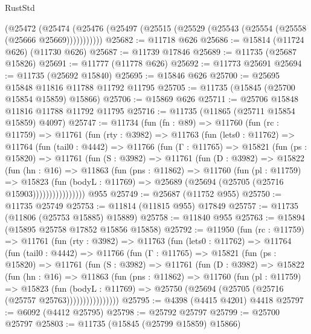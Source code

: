 \begin{lexlean}{RustStd}
\begin{coremodule}
      (@25472
        (@25474 (@25476 (@25497 (@25515 (@25529 (@25543 (@25554 (@25558 (@25666 @25669)))))))))))
@25682 := @11718 @626
@25686 := @15814 (@11724 @626) (@11730 @626)
@25687 := @11739 @17846
@25689 := @11735 (@25687 @15826)
@25691 := @11777 (@11778 @626)
@25692 := @11773 @25691
@25694 := @11735 (@25692 @15840)
@25695 := @15846 @626
@25700 := @25695 @15848 @11816 @11788 @11792 @11795
@25705 := @11735 (@15845 (@25700 @15854 @15859) @15866)
@25706 := @15869 @626
@25711 := @25706 @15848 @11816 @11788 @11792 @11795
@25716 := @11735 (@11865 (@25711 @15854 @15859) @4097)
@25747 := @11734
    (fun (fn : @89) =>
    @11760
      (fun (rc : @11759) =>
      @11761
        (fun (rty : @3982) =>
        @11763
          (fun (lets0 : @11762) =>
          @11764
            (fun (tail0 : @4442) =>
            @11766
              (fun (Γ : @11765) =>
              @15821
                (fun (ps : @15820) =>
                @11761
                  (fun (S : @3982) =>
                  @11761
                    (fun (D : @3982) =>
                    @15822
                      (fun (hn : @16) =>
                      @11863
                        (fun (pns : @11862) =>
                        @11760
                          (fun (pl : @11759) =>
                          @15823
                            (fun (bodyL : @11769) =>
                            @25689 (@25694 (@25705 (@25716 @15903))))))))))))))))
    @955
@25749 := @25687 (@11752 @955)
@25750 := @11735 @25749
@25753 := @11814 (@11815 @955) @17849
@25757 := @11735 (@11806 (@25753 @15885) @15889)
@25758 := @11840 @955
@25763 := @15894 (@15895 @25758 @17852 @15856 @15858)
@25792 := @11950
    (fun (rc : @11759) =>
    @11761
      (fun (rty : @3982) =>
      @11763
        (fun (lets0 : @11762) =>
        @11764
          (fun (tail0 : @4442) =>
          @11766
            (fun (Γ : @11765) =>
            @15821
              (fun (ps : @15820) =>
              @11761
                (fun (S : @3982) =>
                @11761
                  (fun (D : @3982) =>
                  @15822
                    (fun (hn : @16) =>
                    @11863
                      (fun (pns : @11862) =>
                      @11760
                        (fun (pl : @11759) =>
                        @15823
                          (fun (bodyL : @11769) =>
                          @25750 (@25694 (@25705 (@25716 (@25757 @25763))))))))))))))))
@25795 := @4398 (@4415 @4201) @4418
@25797 := @6092 (@4412 @25795)
@25798 := @25792 @25797
@25799 := @25700 @25797
@25803 := @11735 (@15845 (@25799 @15859) @15866)

\end{coremodule}
\end{lexlean}
